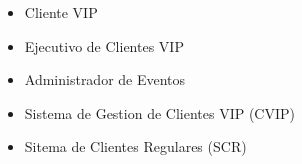 \begin{itemize}
	\item Cliente VIP
	\item Ejecutivo de Clientes VIP
	\item Administrador de Eventos
	\item Sistema de Gestion de Clientes VIP (CVIP)
	\item Sitema de Clientes Regulares (SCR)
\end{itemize}
